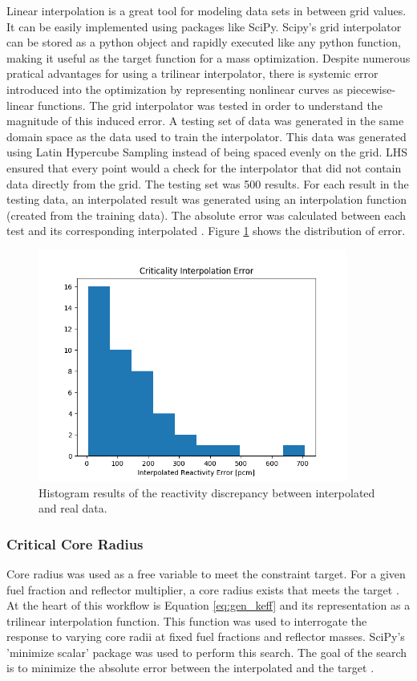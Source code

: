 Linear interpolation is a great tool for modeling data sets in between grid
values. It can be easily implemented using packages like SciPy. Scipy's grid
interpolator can be stored as a python object and rapidly executed like any
python function, making it useful as the target function for a mass
optimization. Despite numerous pratical advantages for using a trilinear
interpolator, there is systemic error introduced into the optimization by
representing nonlinear curves as piecewise-linear functions. The grid
interpolator was tested in order to understand the magnitude of this induced
error. A testing set of data was generated in the same domain space as the data
used to train the interpolator. This data was generated using Latin Hypercube
Sampling instead of being spaced evenly on the grid. LHS ensured that every
point would a check for the interpolator that did not contain data directly from
the grid. The testing set was 500 \keff results. For each \keff result in the
testing data, an interpolated result was generated using an interpolation
function (created from the training data). The absolute error was calculated
between each test \keff and its corresponding interpolated \keff. Figure
\ref{fig:interp_check} shows the distribution of error.

\begin{figure}[h]
    \centering
    \includegraphics[width=4in]{../images/check_interp.png}
\caption{Histogram results of the reactivity discrepancy between interpolated
and real data.}
\label{fig:interp_check}
\end{figure}

\subsubsection{Critical Core Radius}
Core radius was used as a free variable to meet the \keff constraint target. For
a given fuel fraction and reflector multiplier, a core radius exists that meets
the target \keff. At the heart of this workflow is Equation \ref{eq:gen_keff}
and its representation as a trilinear interpolation function. This function was
used to interrogate the \keff response to varying core radii at fixed fuel
fractions and reflector masses. SciPy's 'minimize scalar' package was used to
perform this search. The goal of the search is to minimize the absolute error
between the interpolated \keff and the target \keff.

